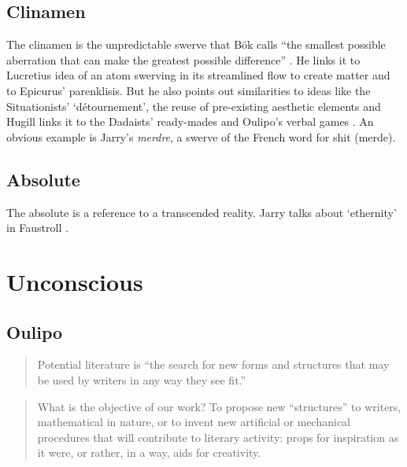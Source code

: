 \subsection{Clinamen}
\label{s:clinamen}

The clinamen is the unpredictable swerve that Bök calls ``the smallest possible aberration that can make the greatest possible difference'' \autocite*{Bok2002}. He links it to Lucretius idea of an atom swerving in its streamlined flow to create matter and to Epicurus' parenklisis. But he also points out similarities to ideas like the Situationists' `détournement', the reuse of pre-existing aesthetic elements and Hugill links it to the Dadaists' ready-mades and Oulipo's verbal games \autocite*{Hugill2012}. An obvious example is Jarry's \emph{merdre}, a swerve of the French word for shit (merde).


\subsection{Absolute}
\label{s:absolute}

The absolute is a reference to a transcended reality. Jarry talks about `ethernity' in Faustroll \autocite*{Jarry1996}.


\section{Unconscious}

\subsection{Oulipo}
\label{s:patalipo}

\begin{quotation}
  Potential literature is ``the search for new forms and structures that may be used by writers in any way they see fit.'' 
\end{quotation}


\begin{quotation}
  What is the objective of our work? To propose new ``structures'' to writers, mathematical in nature, or to invent new artificial or mechanical procedures that will contribute to literary activity: props for inspiration as it were, or rather, in a way, aids for creativity. 
\end{quotation}

